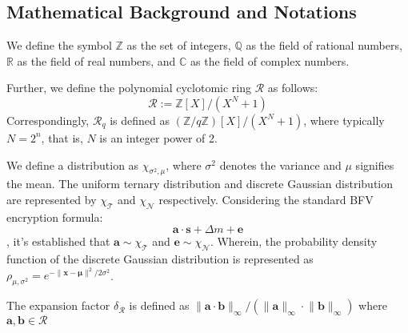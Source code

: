 \documentclass[11pt]{article}
\begin{document}
\subsection{Mathematical Background and Notations}
\label{sec:basic_def}
We define the symbol $\mathbb{Z}$ as the set of integers, $\mathbb{Q}$ as the field of rational numbers, $\mathbb{R}$ as the field of real numbers, and $\mathbb{C}$ as the field of complex numbers.

Further, we define the polynomial cyclotomic ring $\mathcal{R}$ as follows: $$\mathcal{R}:=\mathbb{Z}[X]/(X^N+1)$$ Correspondingly, $\mathcal{R}_q$ is defined as $(\mathbb{Z}/q\mathbb{Z})[X]/(X^N+1)$, where typically $N=2^n$, that is, $N$ is an integer power of 2.

We define a distribution as $\chi_{\sigma^2,\mu}$, where $\sigma^2$ denotes the variance and $\mu$ signifies the mean. The uniform ternary distribution and discrete Gaussian distribution are represented by $\chi_\mathcal{T}$ and $\chi_\mathcal{N}$ respectively. Considering the standard BFV encryption formula: $$\mathbf{a}\cdot \mathbf{s} +\Delta m +\mathbf{e}$$, it's established that $\mathbf{a}\sim\chi_\mathcal{T}$ and $\mathbf{e}\sim\chi_{\mathcal{N}}$. Wherein, the probability density function of the discrete Gaussian distribution is represented as $\rho_{\mu,\sigma^2}=e^{-\lVert\mathbf{x}-\mathbf{\mu}\rVert^2/2\sigma^2}$.

The expansion factor $\delta_\mathcal{R}$ is defined as $\lVert \mathbf{a}\cdot\mathbf{b}\rVert_\infty/(\lVert\mathbf{a}\rVert_\infty\cdot\lVert\mathbf{b}\rVert_\infty)$ where $\mathbf{a},\mathbf{b}\in \mathcal{R}$
\end{document}
